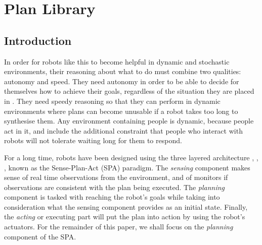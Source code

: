 \chapter{Plan Library}

\ifpdf
    \graphicspath{{Chapter4/Figs/Raster/}{Chapter4/Figs/PDF/}{Chapter4/Figs/}}
\else
    \graphicspath{{Chapter4/Figs/Vector/}{Chapter4/Figs/}}
\fi

\section{Introduction}

In order for robots like this to become helpful in dynamic and stochastic environments, their reasoning about what to do must combine two qualities: autonomy and speed. They need autonomy in order to be able to decide for themselves how to achieve  their goals, regardless of the situation they are placed in \cite{Ingrand:DeliberationRoboticsSurvey}. They need speedy reasoning so that they can perform in dynamic environments where plans can become unusable if a robot takes too long to synthesise them. Any environment containing people is dynamic, because people act in it, and include the additional constraint that people who interact with robots will not tolerate waiting long for them to respond.

For a long time, robots have been designed using the three layered architecture \cite{Gat:98}, \cite{ambros:88}, \cite{Nasa:3T}, known as the Sense-Plan-Act (SPA) paradigm. The \textit{sensing} component makes sense of real time observations from the environment, and of monitors if observations are consistent with the plan being executed. The \textit{planning} component is tasked with reaching the robot's goals while taking into consideration what the sensing component provides as an initial state. Finally, the \textit{acting} or executing part will put the plan into action by using the robot's actuators. For the remainder of this paper, we shall focus on the \textit{planning} component of the SPA.

